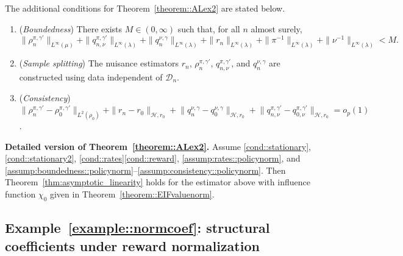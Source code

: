 \documentclass[11pt]{article}
\theoremstyle{plain}
\begin{document}
The additional conditions for Theorem~\ref{theorem::ALex2} are stated below.
\begin{enumerate}[label=\textbf{(E\arabic***)}, ref=E\arabic***, resume = efficiency2]
    \item \label{assump:boundedness::policynorm}(\textit{Boundedness})
    There exists $M \in (0,\infty)$ such that, for all $n$ almost surely,
    \[
      \|\rho_n^{\pi,\gamma'}\|_{L^\infty(\mu)}
      + \|q_{n,\nu}^{\pi,\gamma'}\|_{L^\infty(\lambda)}
      + \|q_n^{\nu,\gamma}\|_{L^\infty(\lambda)}
      + \|r_n\|_{L^\infty(\lambda)}
      + \|\pi^{-1}\|_{L^\infty(\lambda)}
      + \|\nu^{-1}\|_{L^\infty(\lambda)}
      < M.
    \]

    \item \label{assump:splitting::policynorm}(\textit{Sample splitting})
    The nuisance estimators
    $r_n$, $\rho_n^{\pi,\gamma'}$, $q_{n,\nu}^{\pi,\gamma'}$, and $q_n^{\nu,\gamma}$
    are constructed using data independent of $\mathcal{D}_n$.

    \item \label{assump:consistency::policynorm}(\textit{Consistency})
   $ \|\rho_n^{\pi,\gamma'} - \rho_0^{\pi,\gamma'}\|_{L^2(\rho_0)}
      + \|r_n - r_0\|_{\mathcal{H},r_0} +
    \bigl\|
       q_n^{\nu,\gamma} - q_0^{\nu,\gamma}
    \bigr\|_{\mathcal{H},r_0} +   \bigl\|
      q_{n,\nu}^{\pi,\gamma'} - q_{0,\nu}^{\pi,\gamma'}
    \bigr\|_{\mathcal{H},r_0}
    = o_p(1)$.
\end{enumerate}

\medskip\noindent\textbf{Detailed version of Theorem~\ref{theorem::ALex2}.}
Assume \ref{cond::stationary}, \ref{cond::stationary2},
\ref{cond::rates}\ref{cond::reward},
\ref{assump:rates::policynorm}, and
\ref{assump:boundedness::policynorm}--\ref{assump:consistency::policynorm}.
Then Theorem~\ref{thm:asymptotic_linearity} holds for the estimator above with
influence function \(\chi_0\) given in Theorem~\ref{theorem::EIFvaluenorm}.

\subsection{Example~\ref{example::normcoef}: structural coefficients under reward normalization}
\end{document}
